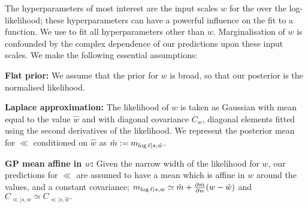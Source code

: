\documentclass{article} %
\begin{document}
The hyperparameters of most interest are the input scales $w$ for the \gpb over the log-likelihood; these hyperparameters can have a powerful influence on the fit to a function. We use  to fit all hyperparameters other than $w$. Marginalisation of $w$ is confounded by the complex dependence of our predictions upon these input scales. 
We make the following essential assumptions:

{\bf Flat prior:} We assume that the prior for $w$ is broad, so that our posterior is the normalised likelihood.

{\bf Laplace approximation:} The likelihood of $w$ is taken as Gaussian with mean equal to the  value $\hat{w}$ and with diagonal covariance $C_w$, diagonal elements fitted using the second derivatives of the likelihood. We represent the posterior mean for $\ll$ conditioned on $\hat{w}$ as $\hat{m} \deq m_{\ll|s,\hat{w}}$.

{\bf GP mean affine in $w$:} Given the narrow width of the likelihood for $w$, our predictions for $\ll$ are assumed to have a \gpb mean which is affine in $w$ around the  values, and a constant covariance;
$m_{\ll|s,w} \simeq \hat{m}
 + \pderiv{\hat{m} }{w} (w- \hat{w})$
and
$
C_{\ll|s, w} \simeq C_{\ll|s, \hat{w}}.
$
 
\end{document}
